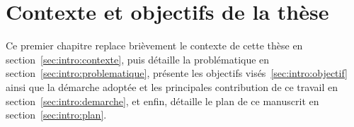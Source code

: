 \chapter{Contexte et objectifs de la thèse}
Ce premier chapitre replace brièvement le contexte de cette thèse en section~\ref{sec:intro:contexte}, puis détaille la problématique en section~\ref{sec:intro:problematique}, présente les objectifs visés~\ref{sec:intro:objectif} ainsi que la démarche adoptée et les principales contribution de ce travail en section~\ref{sec:intro:demarche}, et enfin, détaille le plan de ce manuscrit en section~\ref{sec:intro:plan}.





